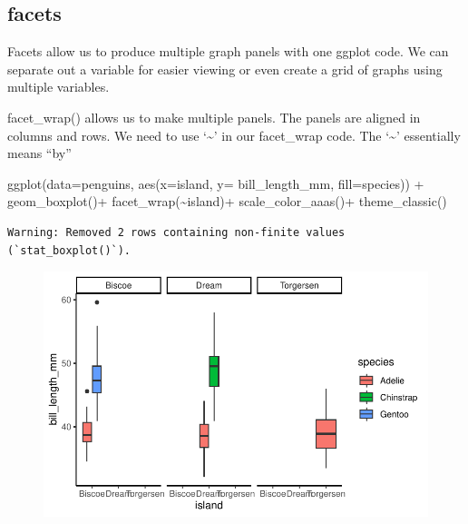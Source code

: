 \documentclass[
  letterpaper,
  DIV=11,
  numbers=noendperiod]{scrartcl}
\newenvironment{Shaded}{\begin{snugshade}}{\end{snugshade}}
\newcommand{\AttributeTok}[1]{\textcolor[rgb]{0.40,0.45,0.13}{#1}}
\newcommand{\FunctionTok}[1]{\textcolor[rgb]{0.28,0.35,0.67}{#1}}
\newcommand{\NormalTok}[1]{\textcolor[rgb]{0.00,0.23,0.31}{#1}}
\newcommand{\SpecialCharTok}[1]{\textcolor[rgb]{0.37,0.37,0.37}{#1}}
\begin{document}
\hypertarget{facets}{%
\subsection{\texorpdfstring{\textbf{facets}}{facets}}\label{facets}}

Facets allow us to produce multiple graph panels with one ggplot code.
We can separate out a variable for easier viewing or even create a grid
of graphs using multiple variables.

facet\_wrap() allows us to make multiple panels. The panels are aligned
in columns and rows. We need to use `\textasciitilde{}' in our
facet\_wrap code. The `\textasciitilde{}' essentially means ``by''

\begin{Shaded}
\begin{Highlighting}[]
\FunctionTok{ggplot}\NormalTok{(}\AttributeTok{data=}\NormalTok{penguins, }\FunctionTok{aes}\NormalTok{(}\AttributeTok{x=}\NormalTok{island, }\AttributeTok{y=}\NormalTok{ bill\_length\_mm, }\AttributeTok{fill=}\NormalTok{species)) }\SpecialCharTok{+}
  \FunctionTok{geom\_boxplot}\NormalTok{()}\SpecialCharTok{+}
  \FunctionTok{facet\_wrap}\NormalTok{(}\SpecialCharTok{\textasciitilde{}}\NormalTok{island)}\SpecialCharTok{+}
  \FunctionTok{scale\_color\_aaas}\NormalTok{()}\SpecialCharTok{+}
  \FunctionTok{theme\_classic}\NormalTok{()}
\end{Highlighting}
\end{Shaded}

\begin{verbatim}
Warning: Removed 2 rows containing non-finite values (`stat_boxplot()`).
\end{verbatim}

\begin{figure}[H]

{\centering \includegraphics{facets_files/figure-pdf/unnamed-chunk-2-1.pdf}

}

\end{figure}
\end{document}
